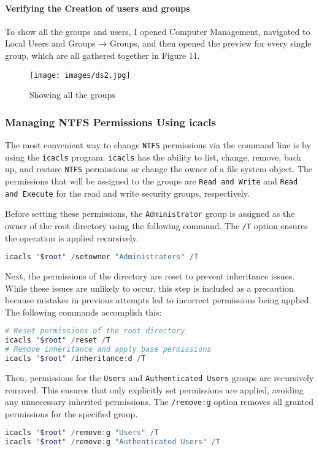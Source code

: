 \documentclass[a4paper]{article}
\newcommand{\abc}{\hfill \break}
\begin{document}
\paragraph{Verifying the Creation of users and groups}\abc
To show all the groups and users, I opened Computer Management, navigated to Local Users and Groups → Groups, and then opened the preview for every single group, which are all gathered together in Figure 11.
\begin{figure}[!htb]
	\texttt{[image: images/ds2.jpg]}
	\centering
	\caption{Showing all the groups}
\end{figure}
\newpage
\subsubsection{Managing NTFS Permissions Using icacls}
The most convenient way to change \texttt{NTFS} permissions via the command line is by using the \texttt{icacls} program.\abc
\texttt{icacls} has the ability to list, change, remove, back up, and restore \texttt{NTFS} permissions or change the owner of a file system object.\cite{icals, icals2}\abc
The permissions that will be assigned to the groups are \texttt{Read and Write} and \texttt{Read and Execute} for the read and write security groups, respectively.\abc

Before setting these permissions, the \texttt{Administrator} group is assigned as the owner of the root directory using the following command. The \texttt{/T} option ensures the operation is applied recursively.\cite{icals} \abc
\begin{lstlisting}[language=PowerShell]
icacls "$root" /setowner "Administrators" /T
\end{lstlisting}

Next, the permissions of the directory are reset to prevent inheritance issues. While these issues are unlikely to occur, this step is included as a precaution because mistakes in previous attempts led to incorrect permissions being applied. The following commands accomplish this:
\begin{lstlisting}[language=PowerShell]
# Reset permissions of the root directory
icacls "$root" /reset /T
# Remove inheritance and apply base permissions
icacls "$root" /inheritance:d /T
\end{lstlisting}

Then, permissions for the \texttt{Users} and \texttt{Authenticated Users} groups are recursively removed. This ensures that only explicitly set permissions are applied, avoiding any unnecessary inherited permissions. The \texttt{/remove:g} option removes all granted permissions for the specified group.
\begin{lstlisting}[language=PowerShell]
icacls "$root" /remove:g "Users" /T
icacls "$root" /remove:g "Authenticated Users" /T
\end{lstlisting}
\end{document}
